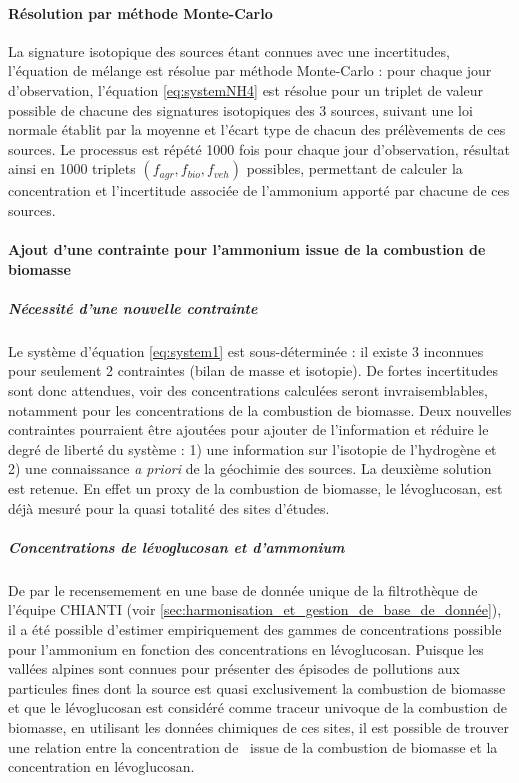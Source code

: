 \paragraph{Résolution par méthode Monte-Carlo}%
\label{par:résolution_par_méthode_monte_carlo}

La signature isotopique des sources étant connues avec une incertitudes, l'équation de
mélange est résolue par méthode Monte-Carlo : pour chaque jour d'observation, l'équation
\ref{eq:systemNH4} est résolue pour un triplet de valeur possible de chacune des
signatures isotopiques des 3 sources, suivant une loi normale établit par la moyenne et
l'écart type de chacun des prélèvements de ces sources. Le processus est répété 1000 fois
pour chaque jour d'observation, résultat ainsi en 1000 triplets $(f_{agr}, f_{bio},
f_{veh})$ possibles, permettant de calculer la concentration et l'incertitude associée de
l'ammonium apporté par chacune de ces sources.

\paragraph{Ajout d'une contrainte pour l'ammonium issue de la combustion de biomasse}%
\label{par:ajout_d_une_contrainte_pour_l_ammonium_issue_de_la_combustion_de_biomasse}

\subparagraph{Nécessité d'une nouvelle contrainte}%
\label{par:nécessité_d_une_nouvelle_contrainte}

Le système d'équation \ref{eq:system1} est sous-déterminée : il existe 3 inconnues pour
seulement 2 contraintes (bilan de masse et isotopie). De fortes incertitudes sont donc
attendues, voir des concentrations calculées seront invraisemblables, notamment pour les
concentrations de la combustion de biomasse.
Deux nouvelles contraintes pourraient être ajoutées pour ajouter de l'information et
réduire le degré de liberté du système : 1) une information sur l'isotopie de l'hydrogène
et 2) une connaissance \textit{a priori} de la géochimie des sources.  La deuxième
solution est retenue.  En effet un proxy de la combustion de biomasse, le lévoglucosan,
est déjà mesuré pour la quasi totalité des sites d'études.

\subparagraph{Concentrations de lévoglucosan et d'ammonium}%
\label{par:concentrations_de_lévoglucosan_et_d_ammonium}

De par le recensemement en une base de donnée unique de la filtrothèque de l'équipe
CHIANTI (voir \ref{sec:harmonisation_et_gestion_de_base_de_donnée}), il a été possible
d'estimer empiriquement des gammes de concentrations possible pour l'ammonium en fonction
des concentrations en lévoglucosan. Puisque les vallées alpines sont connues pour présenter
des épisodes de pollutions aux particules fines dont la source est quasi exclusivement
la combustion de biomasse \autocite{piotAtmospheric2011,gollyEtude2014} et que le lévoglucosan
est considéré comme traceur univoque de la combustion de biomasse, en utilisant les
données chimiques de ces sites, il est possible de trouver une relation entre la
concentration de \NHq~issue de la combustion de biomasse et la concentration en
lévoglucosan. 

